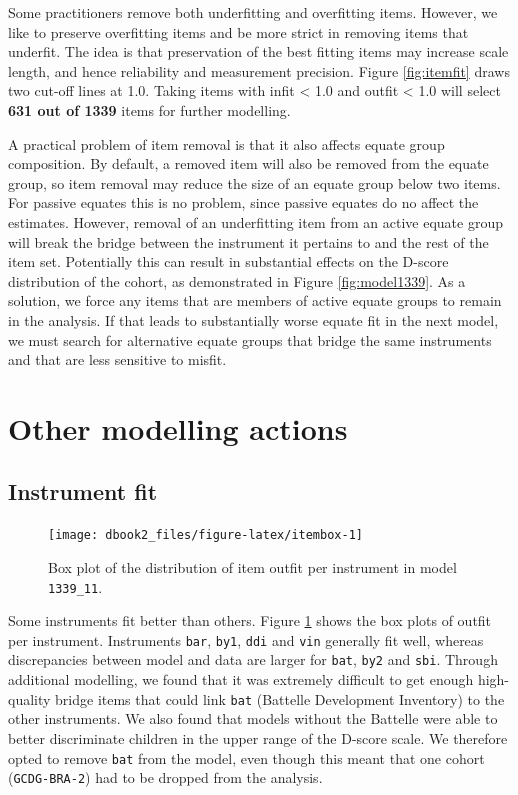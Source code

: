 \documentclass[
]{book}
\begin{document}
Some practitioners remove both underfitting and overfitting items. However, we like to preserve overfitting items and be more strict in removing items that underfit. The idea is that preservation of the best fitting items may increase scale length, and hence reliability and measurement precision. Figure \ref{fig:itemfit} draws two cut-off lines at 1.0. Taking items with infit \textless{} 1.0 and outfit \textless{} 1.0 will select \textbf{631 out of 1339} items for further modelling.

A practical problem of item removal is that it also affects equate group composition. By default, a removed item will also be removed from the equate group, so item removal may reduce the size of an equate group below two items. For passive equates this is no problem, since passive equates do no affect the estimates. However, removal of an underfitting item from an active equate group will break the bridge between the instrument it pertains to and the rest of the item set. Potentially this can result in substantial effects on the D-score distribution of the cohort, as demonstrated in Figure \ref{fig:model1339}. As a solution, we force any items that are members of active equate groups to remain in the analysis. If that leads to substantially worse equate fit in the next model, we must search for alternative equate groups that bridge the same instruments and that are less sensitive to misfit.

\hypertarget{sec:othermodelling}{%
\section{Other modelling actions}\label{sec:othermodelling}}

\hypertarget{instrument-fit}{%
\subsection{Instrument fit}\label{instrument-fit}}

\begin{figure}

{\centering \texttt{[image: dbook2\_files/figure-latex/itembox-1]} 

}

\caption{Box plot of the distribution of item outfit per instrument in model \texttt{1339\_11}.}\label{fig:itembox}
\end{figure}



Some instruments fit better than others. Figure \ref{fig:itembox} shows the box plots of outfit per instrument. Instruments \texttt{bar}, \texttt{by1}, \texttt{ddi} and \texttt{vin} generally fit well, whereas discrepancies between model and data are larger for \texttt{bat}, \texttt{by2} and \texttt{sbi}. Through additional modelling, we found that it was extremely difficult to get enough high-quality bridge items that could link \texttt{bat} (Battelle Development Inventory) to the other instruments. We also found that models without the Battelle were able to better discriminate children in the upper range of the D-score scale. We therefore opted to remove \texttt{bat} from the model, even though this meant that one cohort (\texttt{GCDG-BRA-2}) had to be dropped from the analysis.
\end{document}
